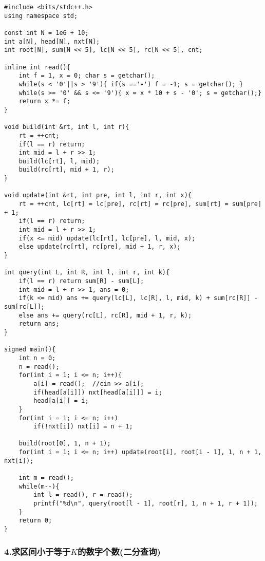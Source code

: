 \documentclass[]{article}
\begin{document}
\begin{verbatim}
#include <bits/stdc++.h>
using namespace std;

const int N = 1e6 + 10;
int a[N], head[N], nxt[N];
int root[N], sum[N << 5], lc[N << 5], rc[N << 5], cnt;

inline int read(){
    int f = 1, x = 0; char s = getchar(); 
    while(s < '0'||s > '9'){ if(s =='-') f = -1; s = getchar(); } 
    while(s >= '0' && s <= '9'){ x = x * 10 + s - '0'; s = getchar();}
    return x *= f; 
}

void build(int &rt, int l, int r){
    rt = ++cnt;
    if(l == r) return;
    int mid = l + r >> 1;
    build(lc[rt], l, mid);
    build(rc[rt], mid + 1, r);
}

void update(int &rt, int pre, int l, int r, int x){
    rt = ++cnt, lc[rt] = lc[pre], rc[rt] = rc[pre], sum[rt] = sum[pre] + 1;
    if(l == r) return;
    int mid = l + r >> 1;
    if(x <= mid) update(lc[rt], lc[pre], l, mid, x);
    else update(rc[rt], rc[pre], mid + 1, r, x);
}

int query(int L, int R, int l, int r, int k){
    if(l == r) return sum[R] - sum[L];
    int mid = l + r >> 1, ans = 0;
    if(k <= mid) ans += query(lc[L], lc[R], l, mid, k) + sum[rc[R]] - sum[rc[L]];
    else ans += query(rc[L], rc[R], mid + 1, r, k);
    return ans;
}

signed main(){
    int n = 0;
    n = read();
    for(int i = 1; i <= n; i++){
        a[i] = read();  //cin >> a[i];
        if(head[a[i]]) nxt[head[a[i]]] = i;
        head[a[i]] = i;
    }
    for(int i = 1; i <= n; i++)
        if(!nxt[i]) nxt[i] = n + 1;
    
    build(root[0], 1, n + 1);
    for(int i = 1; i <= n; i++) update(root[i], root[i - 1], 1, n + 1, nxt[i]);

    int m = read();
    while(m--){
        int l = read(), r = read();
        printf("%d\n", query(root[l - 1], root[r], 1, n + 1, r + 1));
    }
    return 0;
}
\end{verbatim}

\hypertarget{ux6c42ux533aux95f4ux5c0fux4e8eux7b49ux4e8ekux7684ux6570ux5b57ux4e2aux6570ux4e8cux5206ux67e5ux8be2}{%
\subsubsection{\texorpdfstring{4.求区间小于等于\(K\)的数字个数(二分查询)}{4.求区间小于等于K的数字个数(二分查询)}}\label{ux6c42ux533aux95f4ux5c0fux4e8eux7b49ux4e8ekux7684ux6570ux5b57ux4e2aux6570ux4e8cux5206ux67e5ux8be2}}
\end{document}
